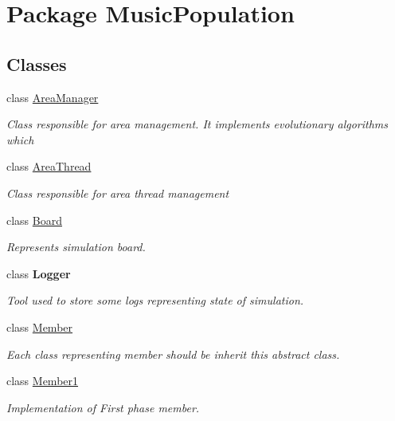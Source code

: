 \hypertarget{namespace_music_population}{\section{Package Music\+Population}
\label{namespace_music_population}
}
\subsection*{Classes}
\begin{DoxyCompactItemize}
\item 
class \hyperlink{class_music_population_1_1_area_manager}{Area\+Manager}
\begin{DoxyCompactList}\small\item\em Class responsible for area management. It implements evolutionary algorithms which \end{DoxyCompactList}\item 
class \hyperlink{class_music_population_1_1_area_thread}{Area\+Thread}
\begin{DoxyCompactList}\small\item\em Class responsible for area thread management \end{DoxyCompactList}\item 
class \hyperlink{class_music_population_1_1_board}{Board}
\begin{DoxyCompactList}\small\item\em Represents simulation board. \end{DoxyCompactList}\item 
class {\bfseries Logger}
\begin{DoxyCompactList}\small\item\em Tool used to store some logs representing state of simulation. \end{DoxyCompactList}\item 
class \hyperlink{class_music_population_1_1_member}{Member}
\begin{DoxyCompactList}\small\item\em Each class representing member should be inherit this abstract class. \end{DoxyCompactList}\item 
class \hyperlink{class_music_population_1_1_member1}{Member1}
\begin{DoxyCompactList}\small\item\em Implementation of First phase member. \end{DoxyCompactList}\item 

\end{DoxyCompactItemize}
